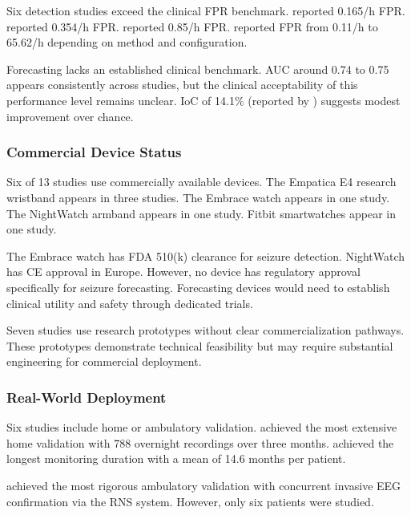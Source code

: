Six detection studies exceed the clinical FPR benchmark. \textcite{dongTwoLayerEnsembleMethod2022} reported 0.165/h FPR. \textcite{wangEpilepticSeizureDetection2025} reported 0.354/h FPR. \textcite{odeDevelopmentEpilepticSeizure2023} reported 0.85/h FPR. \textcite{reintjesECGBasedDetectionEpileptic2025} reported FPR from 0.11/h to 65.62/h depending on method and configuration.

Forecasting lacks an established clinical benchmark. AUC around 0.74 to 0.75 appears consistently across studies, but the clinical acceptability of this performance level remains unclear. IoC of 14.1\% (reported by \textcite{meiselMachineLearningWristband2020}) suggests modest improvement over chance.

\subsubsection{Commercial Device Status}

Six of 13 studies use commercially available devices. The Empatica E4 research wristband appears in three studies. The Embrace watch appears in one study. The NightWatch armband appears in one study. Fitbit smartwatches appear in one study.

The Embrace watch has FDA 510(k) clearance for seizure detection. NightWatch has CE approval in Europe. However, no device has regulatory approval specifically for seizure forecasting. Forecasting devices would need to establish clinical utility and safety through dedicated trials.

Seven studies use research prototypes without clear commercialization pathways. These prototypes demonstrate technical feasibility but may require substantial engineering for commercial deployment.

\subsubsection{Real-World Deployment}

Six studies include home or ambulatory validation. \textcite{dongTwoLayerEnsembleMethod2022} achieved the most extensive home validation with 788 overnight recordings over three months. \textcite{stirlingForecastingSeizureLikelihood2021} achieved the longest monitoring duration with a mean of 14.6 months per patient.

\textcite{nasseriAmbulatorySeizureForecasting2021} achieved the most rigorous ambulatory validation with concurrent invasive EEG confirmation via the RNS system. However, only six patients were studied.

